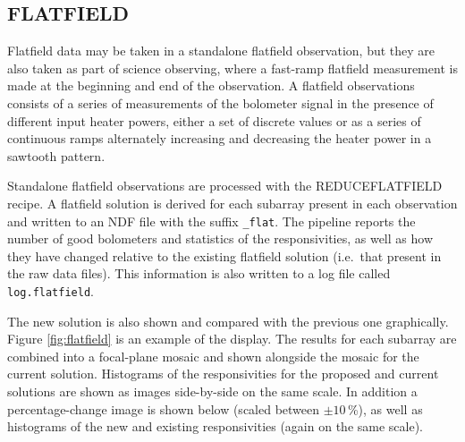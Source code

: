\documentclass[twoside,11pt]{article}
\renewcommand{\_}{\texttt{\symbol{95}}}
\newcommand{\task}[1]{\textsf{#1}}
\begin{document}
\subsection{FLATFIELD}

Flatfield data may be taken in a standalone flatfield observation, but
they are also taken as part of science observing, where a fast-ramp
flatfield measurement is made at the beginning and end of the
observation. A flatfield observations consists of a series of
measurements of the bolometer signal in the presence of different
input heater powers, either a set of discrete values or as a series of
continuous ramps alternately increasing and decreasing the heater
power in a sawtooth pattern.

Standalone flatfield observations are processed with the
\task{REDUCE\_FLATFIELD} recipe. A flatfield solution is derived for
each subarray present in each observation and written to an NDF file
with the suffix \verb+_flat+. The pipeline reports the number of good
bolometers and statistics of the responsivities, as well as how they
have changed relative to the existing flatfield solution (i.e.\ that
present in the raw data files). This information is also written to a
log file called \verb+log.flatfield+.

The new solution is also shown and compared with the previous one
graphically. Figure \ref{fig:flatfield} is an example of the
display. The results for each subarray are combined into a focal-plane
mosaic and shown alongside the mosaic for the current
solution. Histograms of the responsivities for the proposed and
current solutions are shown as images side-by-side on the same
scale. In addition a percentage-change image is shown below (scaled
between $\pm10$\,\%), as well as histograms of the new and existing
responsivities (again on the same scale).
\end{document}
